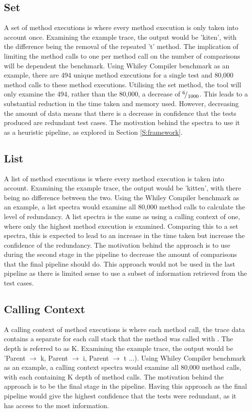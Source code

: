 \subsection{Set}
A set of method executions is where every method execution is only taken into account once. Examining the example trace, the output would be 'kiten', with the difference being the removal of the repeated 't' method. The implication of limiting the method calls to one per method call on the number of comparisons will be dependent the benchmark. Using Whiley Compiler benchmark as an example, there are 494 unique method executions for a single test and 80,000 method calls to these method executions. Utilising the set method, the tool will only examine the 494, rather than the 80,000, a decrease of ${}^{6}\!/_{1000}$. This leads to a substantial reduction in the time taken and memory used. However, decreasing the amount of data means that there is a decrease in confidence that the tests produced are redundant test cases. The motivation behind the spectra to use it as a heuristic pipeline, as explored in Section \ref{S:framework}.

\subsection{List}
A list of method executions is where every method execution is taken into account. Examining the example trace, the output would be 'kitten', with there being no difference between the two. Using the Whiley Compiler benchmark as an example, a list spectra would examine all 80,000 method calls to calculate the level of redundancy. A list spectra is the same as using a calling context of one, where only the highest method execution is examined. Comparing this to a set spectra, this is expected to lead to an increase in the time taken but increase the confidence of the redundancy. The motivation behind the approach is to use during the second stage in the pipeline to decrease the amount of comparisons that the final pipeline should do. This approach would not be used in the last pipeline as there is limited sense to use a subset of information retrieved from the test cases.

\subsection{Calling Context}
A calling context of method executions is where each method call, the trace data contains a separate  for each call stack that the method was called with \cite{callingcontext}. The depth is referred to as K. Examining the example trace, the output would be 'Parent $\rightarrow$ k, Parent $\rightarrow$ i, Parent $\rightarrow$ t ...). Using Whiley Compiler benchmark as an example, a calling context spectra would examine all 80,000 method calls, with each containing K depth of method calls. The motivation behind the approach is to be the final stage in the pipeline. Having this approach as the final pipeline would give the highest confidence that the tests were redundant, as it has access to the most information.

